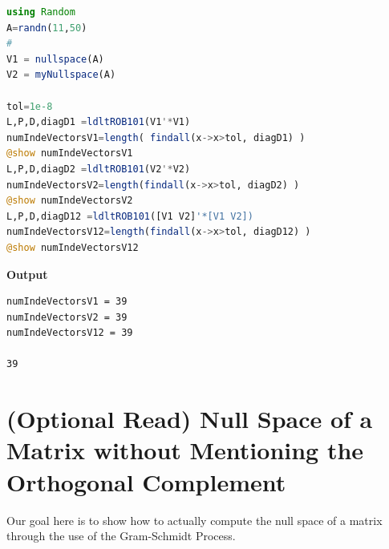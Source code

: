 \begin{lstlisting}[language=Julia,style=mystyle]
using Random
A=randn(11,50)
#
V1 = nullspace(A)
V2 = myNullspace(A)

tol=1e-8
L,P,D,diagD1 =ldltROB101(V1'*V1)
numIndeVectorsV1=length( findall(x->x>tol, diagD1) )
@show numIndeVectorsV1
L,P,D,diagD2 =ldltROB101(V2'*V2)
numIndeVectorsV2=length(findall(x->x>tol, diagD2) )
@show numIndeVectorsV2
L,P,D,diagD12 =ldltROB101([V1 V2]'*[V1 V2])
numIndeVectorsV12=length(findall(x->x>tol, diagD12) )
@show numIndeVectorsV12
\end{lstlisting}
\textbf{Output} 
\begin{verbatim}
numIndeVectorsV1 = 39
numIndeVectorsV2 = 39
numIndeVectorsV12 = 39

39
\end{verbatim}



\section{(Optional Read) Null Space of a Matrix without Mentioning the Orthogonal Complement}
\label{sec:NullSpaceViaGS}

Our goal here is to show how to actually compute the null space of a matrix through the use of the Gram-Schmidt Process. \\

